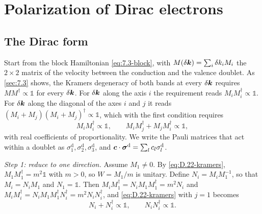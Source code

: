\section{Polarization of Dirac electrons}\label{app:D.22}

\subsection*{The Dirac form}

Start from the block Hamiltonian \cref{eq:7.3-block}, with $M(\delta\bm{k}) = \sum_i\delta k_iM_i$ the $2\times2$ matrix of the velocity between the conduction and the valence doublet. As \cref{sec:7.3} shows, the Kramers degeneracy of both bands at every $\delta\bm{k}$ requires $MM^\dagger \propto \mathbb{1}$ for every $\delta\bm{k}$. For $\delta\bm{k}$ along the axis $i$ the requirement reads $M_iM_i^\dagger \propto \mathbb{1}$. For $\delta\bm{k}$ along the diagonal of the axes $i$ and $j$ it reads $(M_i + M_j)(M_i + M_j)^\dagger \propto \mathbb{1}$, which with the first condition requires
\begin{equation}
  M_iM_i^\dagger \propto \mathbb{1} , \qquad M_iM_j^\dagger + M_jM_i^\dagger \propto \mathbb{1} ,
  \label{eq:D.22-kramers}
\end{equation}
with real coefficients of proportionality. We write the Pauli matrices that act within a doublet as $\sigma^{\mathrm{d}}_1, \sigma^{\mathrm{d}}_2, \sigma^{\mathrm{d}}_3$, and $\bm{c}\cdot\boldsymbol{\sigma}^{\mathrm{d}} = \sum_lc_l\sigma^{\mathrm{d}}_l$.

\emph{Step 1: reduce to one direction.} Assume $M_1 \ne 0$. By \cref{eq:D.22-kramers}, $M_1M_1^\dagger = m^2\mathbb{1}$ with $m > 0$, so $W = M_1/m$ is unitary. Define $N_i = M_iM_1^{-1}$, so that $M_i = N_iM_1$ and $N_1 = \mathbb{1}$. Then $M_iM_1^\dagger = N_iM_1M_1^\dagger = m^2N_i$ and $M_iM_i^\dagger = N_iM_1M_1^\dagger N_i^\dagger = m^2N_iN_i^\dagger$, and \cref{eq:D.22-kramers} with $j = 1$ becomes
\begin{equation*}
  N_i + N_i^\dagger \propto \mathbb{1} , \qquad N_iN_i^\dagger \propto \mathbb{1} .
\end{equation*}


